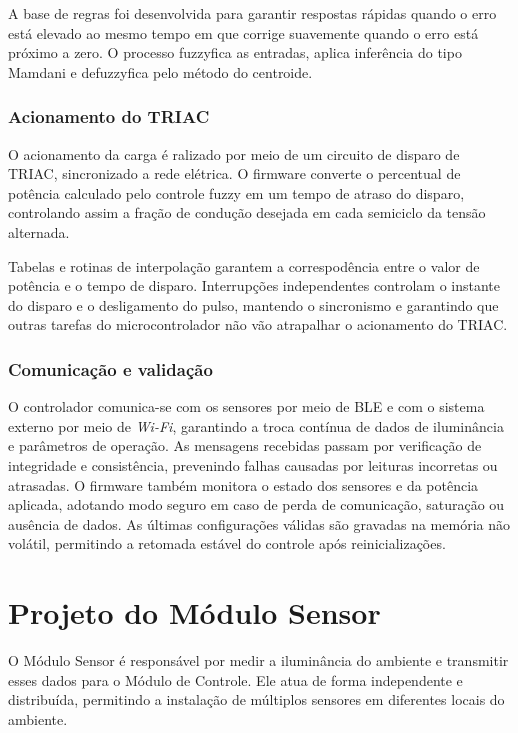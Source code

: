 A base de regras foi desenvolvida para garantir respostas rápidas quando o erro está elevado ao mesmo tempo em que corrige suavemente quando o erro está próximo a zero. O processo fuzzyfica as entradas, aplica inferência do tipo Mamdani e defuzzyfica pelo método do centroide.

\subsubsection{Acionamento do TRIAC}

O acionamento da carga é ralizado por meio de um circuito de disparo de TRIAC, sincronizado a rede elétrica. O firmware converte o percentual de potência calculado pelo controle fuzzy em um tempo de atraso do disparo, controlando assim a fração de condução desejada em cada semiciclo da tensão alternada.

Tabelas e rotinas de interpolação garantem a correspodência entre o valor de potência e o tempo de disparo. Interrupções independentes controlam o instante do disparo e o desligamento do pulso, mantendo o sincronismo e garantindo que outras tarefas do microcontrolador não vão atrapalhar o acionamento do TRIAC.

\subsubsection{Comunicação e validação}

O controlador comunica-se com os sensores por meio de \gls{BLE} e com o sistema externo por meio de \textit{Wi-Fi}, garantindo a troca contínua de dados de iluminância e parâmetros de operação. As mensagens recebidas passam por verificação de integridade e consistência, prevenindo falhas causadas por leituras incorretas ou atrasadas.
O firmware também monitora o estado dos sensores e da potência aplicada, adotando modo seguro em caso de perda de comunicação, saturação ou ausência de dados. As últimas configurações válidas são gravadas na memória não volátil, permitindo a retomada estável do controle após reinicializações.

\section{Projeto do Módulo Sensor}

O Módulo Sensor é responsável por medir a iluminância do ambiente e transmitir esses dados para o Módulo de Controle. Ele atua de forma independente e distribuída, permitindo a instalação de múltiplos sensores em diferentes locais do ambiente.

